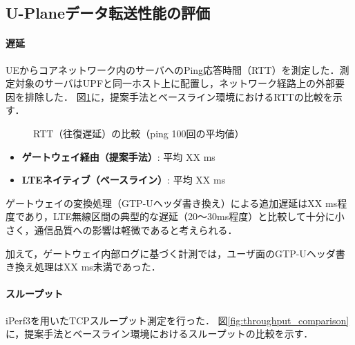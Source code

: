 \subsection{U-Planeデータ転送性能の評価}
\paragraph{遅延}
UEからコアネットワーク内のサーバへのPing応答時間（RTT）を測定した．測定対象のサーバはUPFと同一ホスト上に配置し，ネットワーク経路上の外部要因を排除した．
図\ref{fig:rtt_comparison}に，提案手法とベースライン環境におけるRTTの比較を示す．

\begin{figure}[htbp]
  \centering
  \caption{RTT（往復遅延）の比較（ping 100回の平均値）}
  \label{fig:rtt_comparison}
\end{figure}

\begin{itemize}
    \item \textbf{ゲートウェイ経由（提案手法）}: 平均 XX ms
    \item \textbf{LTEネイティブ（ベースライン）}: 平均 XX ms
\end{itemize}
ゲートウェイの変換処理（GTP-Uヘッダ書き換え）による追加遅延はXX ms程度であり，LTE無線区間の典型的な遅延（20〜30ms程度）と比較して十分に小さく，通信品質への影響は軽微であると考えられる．

加えて，ゲートウェイ内部ログに基づく計測では，ユーザ面のGTP-Uヘッダ書き換え処理はXX ms未満であった．

\paragraph{スループット}
iPerf3を用いたTCPスループット測定を行った．
図\ref{fig:throughput_comparison}に，提案手法とベースライン環境におけるスループットの比較を示す．

